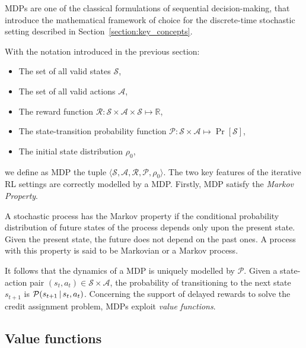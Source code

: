 \aclp{MDP} are one of the classical formulations of sequential decision-making, that introduce the mathematical framework of choice for the discrete-time stochastic setting described in Section~\ref{section:key_concepts}.

With the notation introduced in the previous section:
%
\begin{itemize}
    \item The set of all valid states $\mathcal{S}$,
    \item The set of all valid actions $\mathcal{A}$,
    \item The reward function $\mathcal{R}: \mathcal{S} \times \mathcal{A} \times \mathcal{S} \mapsto \mathbb{R}$,
    \item The state-transition probability function $\mathcal{P}: \mathcal{S} \times \mathcal{A} \mapsto \operatorname{Pr}[\mathcal{S}]$,
    \item The initial state distribution $\rho_0$, 
\end{itemize}
%
we define as \ac{MDP} the tuple $\langle \mathcal{S}, \mathcal{A}, \mathcal{R}, \mathcal{P}, \mathcal{\rho}_0 \rangle$.
%
The two key features of the iterative \ac{RL} settings are correctly modelled by a \ac{MDP}.
Firstly, \ac{MDP} satisfy the \emph{Markov Property}.
%
\begin{definition*}
%
A stochastic process has the Markov property if the conditional probability distribution of future states of the process depends only upon the present state.
Given the present state, the future does not depend on the past ones.
A process with this property is said to be Markovian or a Markov process.
%
\end{definition*}
%
It follows that the dynamics of a \ac{MDP} is uniquely modelled by $\mathcal{P}$.
Given a state-action pair $(s_t, a_t) \in \mathcal{S} \times \mathcal{A}$, the probability of transitioning to the next state $s_{t+1}$ is $\mathcal{P}(s_{t+1} \operatorname{\mid} s_t, a_t)$.
Concerning the support of delayed rewards to solve the credit assignment problem, \acp{MDP} exploit \emph{value functions}.

\subsection{Value functions}
\label{section:value_functions}

